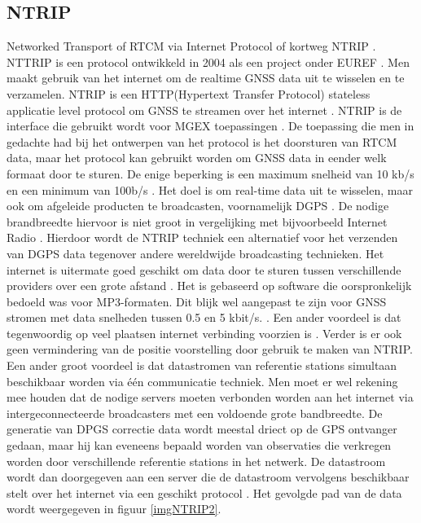 \subsection{NTRIP}
\label{LNTR}
Networked Transport of RTCM via Internet Protocol of kortweg NTRIP \cite{LBibNTRIP,LBibNTRIP3}. NTTRIP is een protocol ontwikkeld in 2004 \cite{LBibNTRIP3} als een project onder EUREF \cite{LBibNTRIP4}. Men maakt gebruik van het internet om de realtime GNSS data uit te wisselen en te verzamelen. NTRIP is een HTTP(Hypertext Transfer Protocol) stateless applicatie level protocol om GNSS te streamen over het internet \cite{LBibNTRIP}. NTRIP is de interface die gebruikt wordt voor MGEX toepassingen \cite{LBibGNSS9}. De toepassing die men in gedachte had bij het ontwerpen van het protocol is het doorsturen van RTCM data, maar het protocol kan gebruikt worden om GNSS data in eender welk formaat door te sturen. De enige beperking is een maximum snelheid van 10 kb/s en een minimum van 100b/s \cite{LBibNTRIP3}.  Het doel is om real-time data uit te wisselen, maar ook om afgeleide producten te broadcasten, voornamelijk DGPS \cite{LBibNTRIP2}. De nodige brandbreedte hiervoor is niet groot in vergelijking met bijvoorbeeld Internet Radio \cite{LBibNTRIP}. Hierdoor wordt de NTRIP techniek een alternatief voor het verzenden van DGPS data tegenover andere  wereldwijde broadcasting technieken. Het internet is uitermate goed geschikt om data door te sturen tussen verschillende providers over een grote afstand \cite{LBibNTRIP2}. Het is gebaseerd op software die oorspronkelijk bedoeld was voor MP3-formaten. Dit blijk wel aangepast te zijn voor GNSS stromen met data snelheden tussen 0.5 en 5 kbit/s. \cite{LBibGPS}. Een ander voordeel is dat tegenwoordig op veel plaatsen internet verbinding voorzien is \cite{LBibNTRIP}. Verder is er ook geen vermindering van de positie voorstelling door gebruik te maken van NTRIP. Een ander groot voordeel is dat datastromen van referentie stations simultaan beschikbaar worden via \'e\'en communicatie techniek. Men moet er wel rekening mee houden dat de nodige servers moeten verbonden worden aan het internet via intergeconnecteerde broadcasters met een voldoende grote bandbreedte.  De generatie van DPGS correctie data wordt meestal driect op de GPS ontvanger gedaan, maar hij kan eveneens bepaald worden van observaties die verkregen worden door verschillende referentie stations in het netwerk. De datastroom wordt dan doorgegeven aan een server die de datastroom vervolgens beschikbaar stelt over het internet via een geschikt protocol \cite{LBibNTRIP2}. Het gevolgde pad van de data wordt weergegeven in figuur \ref{imgNTRIP2}.

